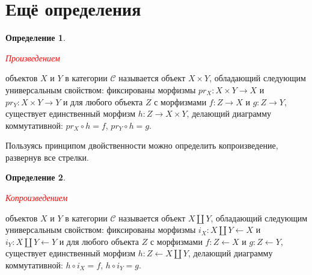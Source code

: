 \documentclass[a4paper]{article}
\theoremstyle{indented}
\theoremstyle{definition}
\newtheorem{defn}{Определение}
\theoremstyle{remark}
\begin{document}
\section{Ещё определения}
\begin{defn}
\hypertarget{n6}{\textcolor{red}{\textit{Произведением}}} объектов $X$ и $Y$ в категории $\mathcal{C}$ называется объект $X\times Y$, обладающий следующим универсальным свойством: фиксированы морфизмы $pr_{X}: X\times Y\rightarrow X$ и $pr_{Y}: X\times Y\rightarrow Y$ и для любого объекта $Z$ с морфизмами $f: Z\rightarrow X$ и $g: Z\rightarrow Y$, существует единственный морфизм $h: Z\rightarrow X\times Y$, делающий диаграмму коммутативной: $pr_{X} \circ h = f$, $pr_{Y} \circ h = g$.
\end{defn}
Пользуясь принципом двойственности можно определить копроизведение, развернув все стрелки.
\begin{defn}
\hypertarget{n6}{\textcolor{red}{\textit{Копроизведением}}} объектов $X$ и $Y$ в категории $\mathcal{C}$ называется объект $X\amalg Y$, обладающий следующим универсальным свойством: фиксированы морфизмы $i_{X}: X\amalg Y\leftarrow X$ и $i_{Y}: X\amalg Y\leftarrow Y$ и для любого объекта $Z$ с морфизмами $f: Z\leftarrow X$ и $g: Z\leftarrow Y$, существует единственный морфизм $h: Z\leftarrow X\amalg Y$, делающий диаграмму коммутативной: $h \circ i_{X} = f$, $h \circ i_{Y} = g$.
\end{defn}
\end{document}
